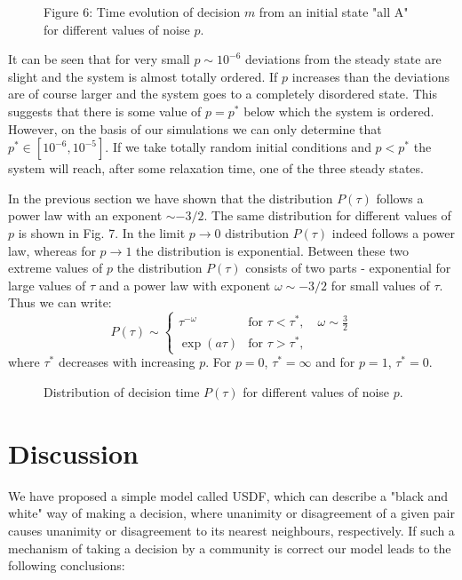 \begin{figure}[htbp]
\centerline{\epsfxsize=12cm }
\caption{Figure 6: Time evolution of decision $m$ from an initial state "all A" for different values of noise $p$.}
\end{figure}

It can be seen that for very small $p
\sim 10^{-6}$ deviations from the steady state are slight and the
system is almost totally ordered. If $p$ increases than the
deviations are of course larger and the system goes to a completely
disordered state. This suggests that there is some value of $p =
p^*$ below which the system is ordered. However, on the basis
of our simulations we can only determine that $p^* \in [10^{-6},
10^{-5}]$. If we take totally random initial conditions and
$p<p^*$ the system will reach, after some relaxation time, one of
the three steady states. 

In the previous section we have
shown that the distribution $P(\tau)$ follows a power law with an
exponent $\sim -3/2$. The same distribution for different values
of $p$ is shown in Fig. 7. In the limit $p \rightarrow 0$
distribution $P(\tau)$ indeed follows a power law, whereas for
$p \rightarrow 1$ the distribution is exponential.
Between these two extreme values of $p$ the distribution $P(\tau)$
consists of two parts - exponential for large  values of $\tau$ and
a power law with exponent $\omega \sim -3/2$ for small
values of $\tau$. Thus we can write:
\begin{equation}
P(\tau) \sim
\left \{
\begin{array}{ll}
\tau^{-\omega} & \mbox{for $\tau < \tau^*$},\quad \omega \sim
\frac{3}{2}\\ \exp(a\tau) & \mbox{for $\tau > \tau^*$},
\end{array}
\right.
\end{equation}
where $\tau^*$ decreases with increasing $p$. For $p=0$, $\tau^*=\infty$
and for $p=1$, $\tau^*=0$.

\begin{figure}[htbp]
\centerline{\epsfxsize=12cm }
\caption{Distribution of decision time $P(\tau)$ for different
values of noise $p$.
}
\end{figure}

\section{Discussion}

We have proposed a simple model called USDF, which can describe a
"black and white" way of making a decision, where unanimity or
disagreement of a given pair causes unanimity or disagreement to its
nearest neighbours, respectively. If such a mechanism of taking a
decision by a community is correct our model leads to the
following conclusions:

